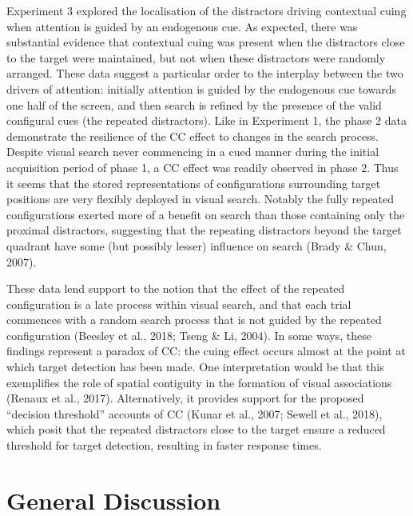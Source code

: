 \documentclass[
  man,
  floatsintext,
  longtable,
  nolmodern,
  notxfonts,
  notimes,
  colorlinks=true,linkcolor=blue,citecolor=blue,urlcolor=blue]{apa7}
\begin{document}
Experiment 3 explored the localisation of the distractors driving
contextual cuing when attention is guided by an endogenous cue. As
expected, there was substantial evidence that contextual cuing was
present when the distractors close to the target were maintained, but
not when these distractors were randomly arranged. These data suggest a
particular order to the interplay between the two drivers of attention:
initially attention is guided by the endogenous cue towards one half of
the screen, and then search is refined by the presence of the valid
configural cues (the repeated distractors). Like in Experiment 1, the
phase 2 data demonstrate the resilience of the CC effect to changes in
the search process. Despite visual search never commencing in a cued
manner during the initial acquisition period of phase 1, a CC effect was
readily observed in phase 2. Thus it seems that the stored
representations of configurations surrounding target positions are very
flexibly deployed in visual search. Notably the fully repeated
configurations exerted more of a benefit on search than those containing
only the proximal distractors, suggesting that the repeating distractors
beyond the target quadrant have some (but possibly lesser) influence on
search (Brady \& Chun, 2007).

These data lend support to the notion that the effect of the repeated
configuration is a late process within visual search, and that each
trial commences with a random search process that is not guided by the
repeated configuration (Beesley et al., 2018; Tseng \& Li, 2004). In
some ways, these findings represent a paradox of CC: the cuing effect
occurs almost at the point at which target detection has been made. One
interpretation would be that this exemplifies the role of spatial
contiguity in the formation of visual associations (Renaux et al.,
2017). Alternatively, it provides support for the proposed ``decision
threshold'' accounts of CC (Kunar et al., 2007; Sewell et al., 2018),
which posit that the repeated distractors close to the target ensure a
reduced threshold for target detection, resulting in faster response
times.

\section{General Discussion}\label{general-discussion}
\end{document}
